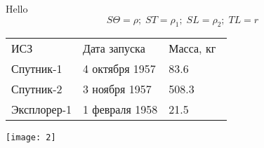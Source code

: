 \documentclass[a4paper,12pt]{article}
\begin{document}
Hello
\[S\Theta = \rho;\;ST = \rho_1;\;SL = \rho_2;\;TL = r\]
\begin{tabular}{ l l l }
ИСЗ & Дата запуска & Масса, кг  \\
Спутник-1 & 4 октября 1957 & 83.6 \\
Спутник-2 & 3 ноября 1957 & 508.3  \\
Эксплорер-1 & 1 февраля 1958 & 21.5 \\
\end{tabular}


\texttt{[image: 2]}
\end{document}
